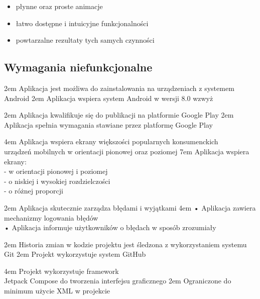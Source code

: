 \begin{itemize}[leftmargin=*]
    \item płynne oraz proste animacje
    \item łatwo dostępne i intuicyjne funkcjonalności
    \item powtarzalne rezultaty tych samych czynności
\end{itemize}

\newpage

\subsection{Wymagania niefunkcjonalne}

{2em}{
    Aplikacja jest możliwa do zainstalowania na urządzeniach z systemem Android
}
{2em}{
    Aplikacja wspiera system Android w wersji 8.0 wzwyż
}

{2em}{
    Aplikacja kwalifikuje się do publikacji na platformie Google Play
}
{2em}{
    Aplikacja spełnia wymagania stawiane przez platformę Google Play
}

{4em}{
    Aplikacja wspiera ekrany większości popularnych konsumenckich\\
    urządzeń mobilnych w orientacji pionowej oraz poziomej
}
{7em}{
    Aplikacja wspiera ekrany:\\
    - w orientacji pionowej i poziomej\\
    - o niskiej i wysokiej rozdzielczości\\
    - o różnej proporcji
}

{2em}{
    Aplikacja skutecznie zarządza błędami i wyjątkami
}
{4em}{
    • Aplikacja zawiera mechanizmy logowania błędów\\
    • Aplikacja informuje użytkowników o błędach w sposób zrozumiały
}

{2em}{
    Historia zmian w kodzie projektu jest śledzona z wykorzystaniem systemu Git
}
{2em}{
    Projekt wykorzystuje system GitHub
}

{4em}{
    Projekt wykorzystuje framework\\
    Jetpack Compose do tworzenia interfejsu graficznego
}
{2em}{
    Ograniczone do minimum użycie XML w projekcie
}

